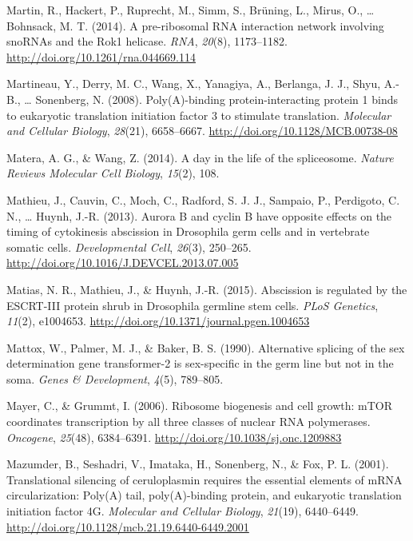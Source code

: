 \documentclass[12pt,twoside]{reedthesis}
\newlength{\cslhangindent}
\newenvironment{cslreferences}%
  {\setlength{\parindent}{0pt}%
  \everypar{\setlength{\hangindent}{\cslhangindent}}\ignorespaces}%
  {\par}
\begin{document}
\begin{cslreferences}
\leavevmode\hypertarget{ref-martinPreribosomalRNAInteraction2014}{}%
Martin, R., Hackert, P., Ruprecht, M., Simm, S., Brüning, L., Mirus, O., \ldots{} Bohnsack, M. T. (2014). A pre-ribosomal RNA interaction network involving snoRNAs and the Rok1 helicase. \emph{RNA}, \emph{20}(8), 1173--1182. \url{http://doi.org/10.1261/rna.044669.114}

\leavevmode\hypertarget{ref-Martineau2008c}{}%
Martineau, Y., Derry, M. C., Wang, X., Yanagiya, A., Berlanga, J. J., Shyu, A.-B., \ldots{} Sonenberg, N. (2008). Poly(A)-binding protein-interacting protein 1 binds to eukaryotic translation initiation factor 3 to stimulate translation. \emph{Molecular and Cellular Biology}, \emph{28}(21), 6658--6667. \url{http://doi.org/10.1128/MCB.00738-08}

\leavevmode\hypertarget{ref-Matera2014}{}%
Matera, A. G., \& Wang, Z. (2014). A day in the life of the spliceosome. \emph{Nature Reviews Molecular Cell Biology}, \emph{15}(2), 108.

\leavevmode\hypertarget{ref-Mathieu2013d}{}%
Mathieu, J., Cauvin, C., Moch, C., Radford, S. J. J., Sampaio, P., Perdigoto, C. N., \ldots{} Huynh, J.-R. (2013). Aurora B and cyclin B have opposite effects on the timing of cytokinesis abscission in Drosophila germ cells and in vertebrate somatic cells. \emph{Developmental Cell}, \emph{26}(3), 250--265. \url{http://doi.org/10.1016/J.DEVCEL.2013.07.005}

\leavevmode\hypertarget{ref-Matias2015g}{}%
Matias, N. R., Mathieu, J., \& Huynh, J.-R. (2015). Abscission is regulated by the ESCRT-III protein shrub in Drosophila germline stem cells. \emph{PLoS Genetics}, \emph{11}(2), e1004653. \url{http://doi.org/10.1371/journal.pgen.1004653}

\leavevmode\hypertarget{ref-Mattox1990}{}%
Mattox, W., Palmer, M. J., \& Baker, B. S. (1990). Alternative splicing of the sex determination gene transformer-2 is sex-specific in the germ line but not in the soma. \emph{Genes \& Development}, \emph{4}(5), 789--805.

\leavevmode\hypertarget{ref-Mayer2006a}{}%
Mayer, C., \& Grummt, I. (2006). Ribosome biogenesis and cell growth: mTOR coordinates transcription by all three classes of nuclear RNA polymerases. \emph{Oncogene}, \emph{25}(48), 6384--6391. \url{http://doi.org/10.1038/sj.onc.1209883}

\leavevmode\hypertarget{ref-Mazumder2001k}{}%
Mazumder, B., Seshadri, V., Imataka, H., Sonenberg, N., \& Fox, P. L. (2001). Translational silencing of ceruloplasmin requires the essential elements of mRNA circularization: Poly(A) tail, poly(A)-binding protein, and eukaryotic translation initiation factor 4G. \emph{Molecular and Cellular Biology}, \emph{21}(19), 6440--6449. \url{http://doi.org/10.1128/mcb.21.19.6440-6449.2001}


\end{cslreferences}
\end{document}
